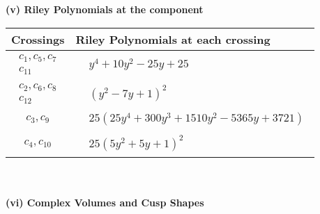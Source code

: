 \documentclass[1p]{elsarticle_modified}
\theoremstyle{definition}
\begin{document}
\newpage\renewcommand{\arraystretch}{1}
\flushleft \textbf{(v) Riley Polynomials at the component}\newline \\
\begin{tabular}{m{50pt}|m{274pt}}
Crossings & \hspace{64pt}Riley Polynomials at each crossing \\
\hline $$\begin{aligned}c_{1},c_{5},c_{7}\\c_{11}\end{aligned}$$&$\begin{aligned}
&y^4+10 y^2-25 y+25
\end{aligned}$\\
\hline $$\begin{aligned}c_{2},c_{6},c_{8}\\c_{12}\end{aligned}$$&$\begin{aligned}
&(y^2-7 y+1)^2
\end{aligned}$\\
\hline $$\begin{aligned}c_{3},c_{9}\end{aligned}$$&$\begin{aligned}
&25(25 y^4+300 y^3+1510 y^2-5365 y+3721)
\end{aligned}$\\
\hline $$\begin{aligned}c_{4},c_{10}\end{aligned}$$&$\begin{aligned}
&25(5 y^2+5 y+1)^2
\end{aligned}$\\
\hline
\end{tabular}\\~\\
\newpage\flushleft \textbf{(vi) Complex Volumes and Cusp Shapes}
\end{document}
